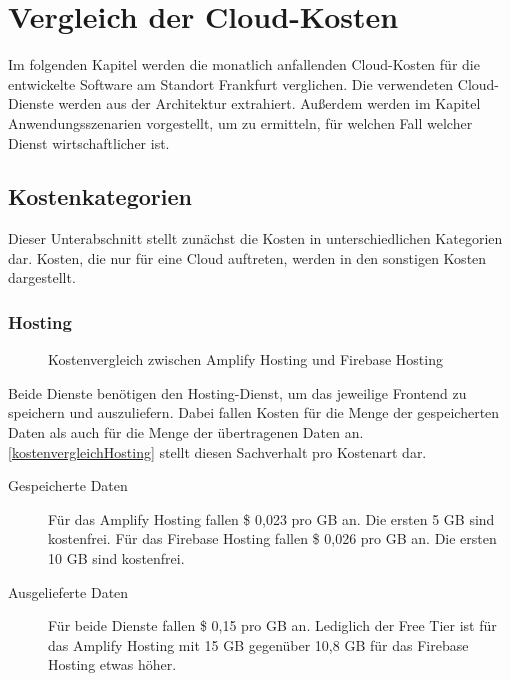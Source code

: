\chapter{Vergleich der Cloud-Kosten}

Im folgenden Kapitel werden die monatlich anfallenden Cloud-Kosten \autocite{awsPricing} \autocite{gcpPricing} für die entwickelte Software am Standort Frankfurt verglichen. Die verwendeten Cloud-Dienste werden aus der Architektur extrahiert. Außerdem werden im Kapitel Anwendungsszenarien vorgestellt, um zu ermitteln, für welchen Fall welcher Dienst wirtschaftlicher ist.

\section{Kostenkategorien}

Dieser Unterabschnitt stellt zunächst die Kosten in unterschiedlichen Kategorien dar. Kosten, die nur für eine Cloud auftreten, werden in den sonstigen Kosten dargestellt.

\subsection{Hosting}

\begin{figure}%
    \centering
    \qquad
    \caption{Kostenvergleich zwischen Amplify Hosting und Firebase Hosting}%
    \label{kostenvergleichHosting}%
\end{figure}

Beide Dienste benötigen den Hosting-Dienst, um das jeweilige Frontend zu speichern und auszuliefern. Dabei fallen Kosten für die Menge der gespeicherten Daten als auch für die Menge der übertragenen Daten an. \autoref{kostenvergleichHosting} stellt diesen Sachverhalt pro Kostenart dar.

\begin{description}
  \item[Gespeicherte Daten] Für das Amplify Hosting fallen \$ 0,023 pro GB an. Die ersten 5 GB sind kostenfrei. Für das Firebase Hosting fallen \$ 0,026 pro GB an. Die ersten 10 GB sind kostenfrei.
  \item[Ausgelieferte Daten] Für beide Dienste fallen \$ 0,15 pro GB an. Lediglich der Free Tier ist für das Amplify Hosting mit 15 GB gegenüber 10,8 GB für das Firebase Hosting etwas höher.
\end{description}

